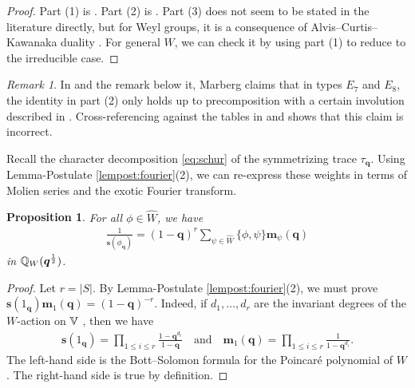 \documentclass[a4paper,10pt,leqno]{amsart}
\theoremstyle{plain}
\theoremstyle{plain}
\theoremstyle{plain}
\newtheorem{prop}[thm]{Proposition}
\theoremstyle{definition}
\theoremstyle{remark}
\newtheorem{rem}[thm]{Remark}
\newcommand{\Q}{\bm{q}}
\begin{document}
\begin{proof}
Part (1) is \cite[Postulate 2.3]{lusztig_1993}.
Part (2) is \cite[\S{13.6}]{carter}.
Part (3) does not seem to be stated in the literature directly, but for Weyl groups, it is a consequence of Alvis--Curtis--Kawanaka duality \cite[\S{8.2}]{carter}.
For general $W$, we can check it by using part (1) to reduce to the irreducible case.
\end{proof}

\begin{rem}
In \cite[Thm.\ 4.3]{marberg} and the remark below it, Marberg claims that in types $E_7$ and $E_8$, the identity in part (2) only holds up to precomposition with a certain involution described in \cite{bl}.
Cross-referencing against the tables in \cite[\S{13.9}]{carter} and \cite[Ch.\ 4]{lusztig_1984} shows that this claim is incorrect.
\end{rem}

Recall the character decomposition \eqref{eq:schur} of the symmetrizing trace $\tau_{\Q}$.
Using Lemma-Postulate \ref{lempost:fourier}(2), we can re-express these weights in terms of Molien series and the exotic Fourier transform.

\begin{prop}\label{prop:molien}
For all $\phi \in \hat{W}$, we have 
\begin{align}
\frac{1}{\bm{s}(\phi_{\Q})}
=
(1 - \Q)^r \sum_{\psi \in \hat{W}}
{\{\phi, \psi\}}
\bm{m}_\psi(\Q)
\end{align}
in $\bb{Q}_W(\Q^{\frac{1}{2}})$.
\end{prop}

\begin{proof}
Let $r = |S|$.
By Lemma-Postulate \ref{lempost:fourier}(2), we must prove $\bm{s}(1_{\Q}) \bm{m}_1(\Q) = (1 - \Q)^{-r}$.
Indeed, if $d_1, \ldots, d_r$ are the invariant degrees of the $W$-action on $\mathbb{V}$ \cite[149]{gp}, then we have
\begin{align}
\bm{s}(1_{\Q}) = \prod_{1 \leq i \leq r} 
\frac{1 - \Q^{d_i}}{1 - \Q}
\quad\text{and}\quad
\bm{m}_1(\Q) = \prod_{1 \leq i \leq r}
{\frac{1}{1 - \Q^{d_i}}}.
\end{align}
The left-hand side is the Bott--Solomon formula for the Poincar\'e polynomial of $W$ \cite{solomon}.
The right-hand side is true by definition.
\end{proof}

\subsection{}\label{subsec:families}
\end{document}

